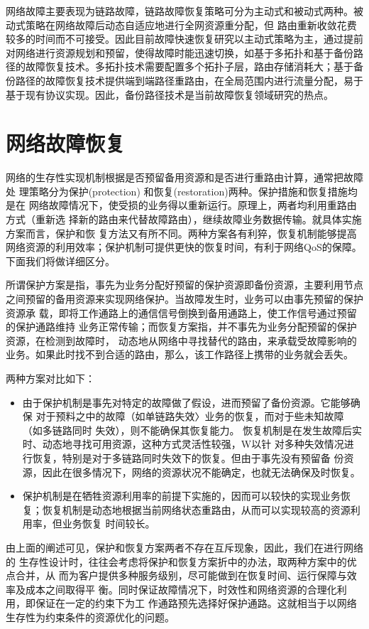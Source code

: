 网络故障主要表现为链路故障，链路故障恢复策略可分为主动式和被动式两种\cite{kvalbein2009multiple}。被动式策略在网络故障后动态自适应地进行全网资源重分配，但
路由重新收敛花费较多的时间而不可接受。因此目前故障快速恢复研究以主动式策略为主，通过提前对网络进行资源规划和预留，使得故障时能迅速切换，如基于多拓扑\cite{shand2010ip}和基于备份路径的故障恢复技术。多拓扑技术需要配置多个拓扑子层，路由存储消耗大；基于备份路径的故障恢复技术提供端到端路径重路由，在全局范围内进行流量分配，易于基于现有协议实现。因此，备份路径技术是当前故障恢复领域研究的热点\cite{yang2014keep,suchara2011network,banner2010designing}。

\section{网络故障恢复}
网络的生存性实现机制根据是否预留备用资源和是否进行重路由计算，通常把故障处 理策略分为保护(protection) 和恢复(restoration)两种。保护措施和恢复措施均是在 网络故障情况下，使受损的业务得以重新运行。原理上，两者均利用重路由方式（重新选 择新的路由来代替故障路由），继续故障业务数据传输。就具体实施方案而言，保护和恢 复方法又有所不同。两种方案各有利猝，恢复机制能够提高网络资源的利用效率；保护机制可提供更快的恢复时间，有利于网络QoS的保障。下面我们将做详细区分。

所谓保护方案是指，事先为业务分配好预留的保护资源即备份资源，主要利用节点 之间预留的备用资源来实现网络保护。当故障发生时，业务可以由事先预留的保护资源承 载，即将工作通路上的通信信号倒换到备用通路上，使工作信号通过预留的保护通路维持 业务正常传输；而恢复方案指，并不事先为业务分配预留的保护资源，在检测到故障时， 动态地从网络中寻找替代的路由，来承载受故障影响的业务。如果此时找不到合适的路由，那么，该工作路径上携带的业务就会丢失。

两种方案对比如下：
\begin{itemize}
  \item 由于保护机制是事先对特定的故障做了假设，进而预留了备份资源。它能够确保 对于预料之中的故障（如单链路失效〉业务的恢复，而对于些未知故障（如多链路同时 失效），则不能确保其恢复能力。
恢复机制是在发生故障后实时、动态地寻找可用资源，这种方式灵活性较强，W以针 对多种失效情况进行恢复，特别是对于多链路同时失效下的恢复。但由于事先没有预留备 份资源，因此在很多情况下，网络的资源状况不能确定，也就无法确保及时恢复。
  \item 保护机制是在牺牲资源利用率的前提下实施的，因而可以较快的实现业务恢复；恢复机制是动态地根据当前网络状态重路由，从而可以实现较高的资源利用率，但业务恢复 时间较长。
\end{itemize}
由上面的阐述可见，保护和恢复方案两者不存在互斥现象，因此，我们在进行网络的 生存性设计时，往往会考虑将保护和恢复方案折中的办法，取两种方案中的优点合并，从 而为客户提供多种服务级别，尽可能做到在恢复时间、运行保障与效率及成本之间取得平 衡。同时保证故障情况下，时效性和网络资源的合理化利用，即保证在一定的约束下为工 作通路预先选择好保护通路。这就相当于以网络生存性为约束条件的资源优化的问题。


